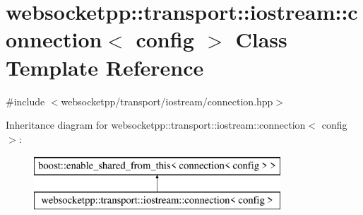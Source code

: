 \hypertarget{classwebsocketpp_1_1transport_1_1iostream_1_1connection}{}\section{websocketpp\+:\+:transport\+:\+:iostream\+:\+:connection$<$ config $>$ Class Template Reference}
\label{classwebsocketpp_1_1transport_1_1iostream_1_1connection}


{\ttfamily \#include $<$websocketpp/transport/iostream/connection.\+hpp$>$}

Inheritance diagram for websocketpp\+:\+:transport\+:\+:iostream\+:\+:connection$<$ config $>$\+:\begin{figure}[H]
\begin{center}
\leavevmode
\includegraphics[height=2.000000cm]{classwebsocketpp_1_1transport_1_1iostream_1_1connection}
\end{center}
\end{figure}
